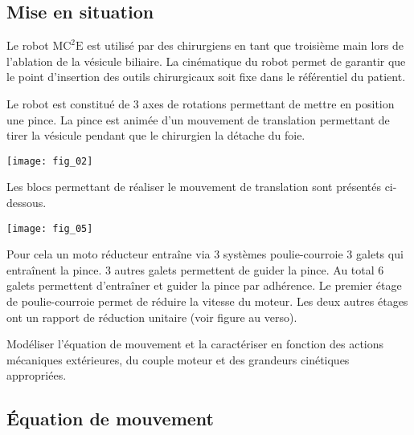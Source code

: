\ifprof
\else
\begin{multicols}{2}
\fi
\section*{Mise en situation}

\ifprof
\else
Le robot $\text{MC}^2\text{E}$ est utilisé par des chirurgiens en tant que troisième main lors de l'ablation de la vésicule biliaire. La cinématique du robot permet de garantir que le point d'insertion des outils chirurgicaux soit fixe dans le référentiel du patient. 

Le robot est constitué de 3 axes de rotations permettant de mettre en position une pince. La pince est animée d'un mouvement de translation permettant de tirer la vésicule pendant que le chirurgien la détache du foie. 

\begin{center}
\texttt{[image: fig\_02]}
\end{center}


Les blocs permettant de réaliser le mouvement de translation sont présentés ci-dessous.


\begin{center}
\texttt{[image: fig\_05]}
\end{center}

Pour cela un moto réducteur entraîne via 3 systèmes poulie-courroie 3 galets qui entraînent la pince. 3 autres galets permettent de guider la pince. Au total 6 galets permettent d'entraîner et guider la pince par adhérence. Le premier étage de poulie-courroie permet de réduire la vitesse du moteur. Les deux autres étages ont un rapport de réduction unitaire (voir figure au verso). 
\fi



\begin{obj}
Modéliser l’équation de mouvement et la caractériser en fonction des actions mécaniques extérieures, du couple moteur et des grandeurs cinétiques appropriées.
\end{obj}




\subsection*{Équation de mouvement}



\end{multicols}
